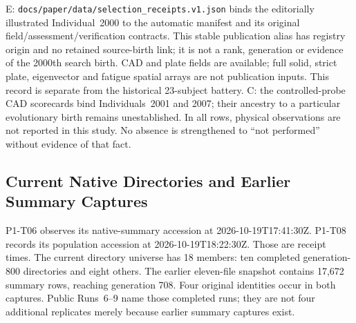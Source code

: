 E: \nolinkurl{docs/paper/data/selection_receipts.v1.json} binds the editorially illustrated Individual~2000 to the automatic manifest and its original field/assessment/verification contracts. This stable publication alias has registry origin  and no retained source-birth link; it is not a rank, generation or evidence of the 2000th search birth. CAD and plate fields are available; full solid, strict plate, eigenvector and fatigue spatial arrays are not publication inputs. This record is separate from the historical 23-subject battery. C: the controlled-probe CAD scorecards bind Individuals~2001 and 2007; their ancestry to a particular evolutionary birth remains unestablished. In all rows, physical observations are not reported in this study. No absence is strengthened to ``not performed'' without evidence of that fact.

\subsection{Current Native Directories and Earlier Summary Captures}
P1-T06 observes its native-summary accession at 2026-10-19T17:41:30Z. P1-T08 records its population accession at 2026-10-19T18:22:30Z. Those are receipt times. The current directory universe has 18 members: ten completed generation-800 directories and eight others. The earlier eleven-file snapshot contains 17,672 summary rows, reaching generation 708. Four original identities occur in both captures. Public Runs~6--9 name those completed runs; they are not four additional replicates merely because earlier summary captures exist.

